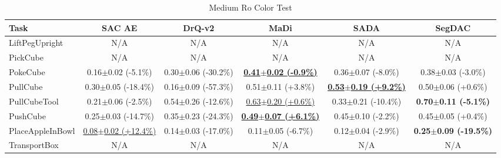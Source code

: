 \begin{table}[htbp]
\centering
\scriptsize
\caption{Medium Ro Color Test}
\label{tab:appendix_rocolortest_medium}
\begin{adjustbox}{max width=\textwidth}
\begin{tabular}{l*{5}{c}}
\toprule
\textbf{Task} & \textbf{SAC AE} & \textbf{DrQ-v2} & \textbf{MaDi} & \textbf{SADA} & \textbf{SegDAC} \\
\midrule
LiftPegUpright & N/A & N/A & N/A & N/A & N/A \\
PickCube & N/A & N/A & N/A & N/A & N/A \\
PokeCube & 0.16$\pm$0.02 \scriptsize{(-5.1\%)} & 0.30$\pm$0.06 \scriptsize{(-30.2\%)} & \textbf{\underline{0.41$\pm$0.02 \scriptsize{(-0.9\%)}}} & 0.36$\pm$0.07 \scriptsize{(-8.0\%)} & 0.38$\pm$0.03 \scriptsize{(-3.0\%)} \\
PullCube & 0.30$\pm$0.05 \scriptsize{(-18.4\%)} & 0.16$\pm$0.09 \scriptsize{(-57.3\%)} & 0.51$\pm$0.11 \scriptsize{(+3.8\%)} & \textbf{\underline{0.53$\pm$0.19 \scriptsize{(+9.2\%)}}} & 0.50$\pm$0.06 \scriptsize{(+0.6\%)} \\
PullCubeTool & 0.21$\pm$0.06 \scriptsize{(-2.5\%)} & 0.54$\pm$0.26 \scriptsize{(-12.6\%)} & \underline{0.63$\pm$0.20 \scriptsize{(+0.6\%)}} & 0.33$\pm$0.21 \scriptsize{(-10.4\%)} & \textbf{0.70$\pm$0.11 \scriptsize{(-5.1\%)}} \\
PushCube & 0.25$\pm$0.03 \scriptsize{(-14.7\%)} & 0.35$\pm$0.23 \scriptsize{(-24.3\%)} & \textbf{\underline{0.49$\pm$0.07 \scriptsize{(+6.1\%)}}} & 0.45$\pm$0.10 \scriptsize{(-2.2\%)} & 0.45$\pm$0.05 \scriptsize{(+0.4\%)} \\
PlaceAppleInBowl & \underline{0.08$\pm$0.02 \scriptsize{(+12.4\%)}} & 0.14$\pm$0.03 \scriptsize{(-17.0\%)} & 0.11$\pm$0.05 \scriptsize{(-6.7\%)} & 0.12$\pm$0.04 \scriptsize{(-2.9\%)} & \textbf{0.25$\pm$0.09 \scriptsize{(-19.5\%)}} \\
TransportBox & N/A & N/A & N/A & N/A & N/A \\
\bottomrule
\end{tabular}
\end{adjustbox}
\end{table}

